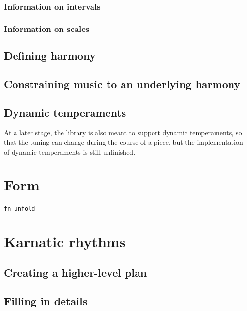 \documentclass[11pt]{article}
\begin{document}
\subsubsection{Information on intervals}
\label{sec:org90cc0ff}


\subsubsection{Information on scales}
\label{sec:org6b6128e}


\subsection{Defining harmony}
\label{sec:orgfbd410f}


\subsection{Constraining music to an underlying harmony}
\label{sec:org2d4f13c}



\subsection{Dynamic temperaments}
\label{sec:orgd674fed}

At a later stage, the library is also meant to support dynamic temperaments, so that the tuning
can change during the course of a piece, but the implementation of dynamic temperaments is
still unfinished.



\section{Form}
\label{sec:orgbd427d6}

\texttt{fn-unfold} 



\section{Karnatic rhythms}
\label{sec:orga2aa36e}

\subsection{Creating a higher-level plan}
\label{sec:orgc321911}


\subsection{Filling in details}
\label{sec:org660cd46}
\end{document}
